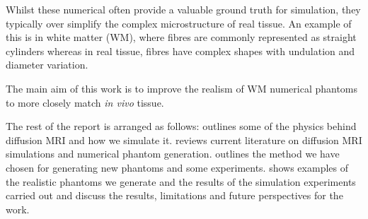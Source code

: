 Whilst these numerical often provide a valuable ground truth for simulation, they typically over simplify the complex microstructure of real tissue.
An example of this is in white matter (WM), where fibres are commonly represented as straight cylinders whereas in real tissue, fibres have complex shapes with undulation and diameter variation.

The main aim of this work is to improve the realism of WM numerical phantoms to more closely match \emph{in vivo} tissue.

The rest of the report is arranged as follows:  outlines some of the physics behind diffusion MRI and how we simulate it.  reviews current literature on diffusion MRI simulations and numerical phantom generation.  outlines the method we have chosen for generating new phantoms and some experiments.  shows examples of the realistic phantoms we generate and the results of the simulation experiments carried out and  discuss the results, limitations and future perspectives for the work.







